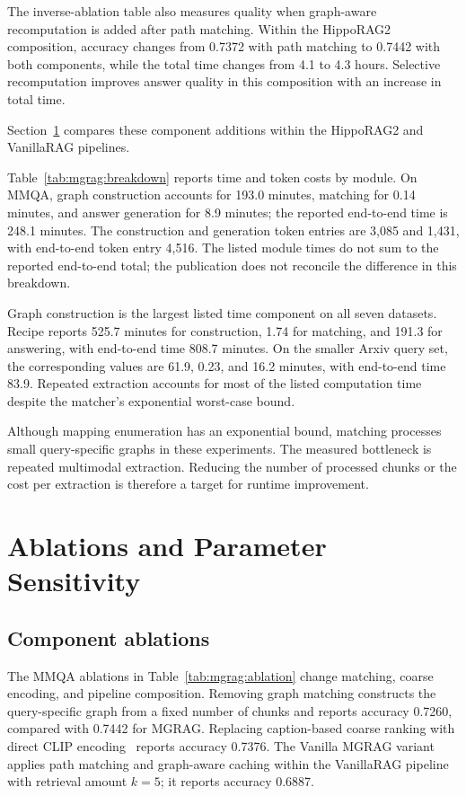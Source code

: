 The inverse-ablation table also measures quality when graph-aware recomputation is added after path matching. Within the HippoRAG2 composition, accuracy changes from 0.7372 with path matching to 0.7442 with both components, while the total time changes from 4.1 to 4.3 hours. Selective recomputation improves answer quality in this composition with an increase in total time.

Section~\ref{sec:mgrag:ablations} compares these component additions within the HippoRAG2 and VanillaRAG pipelines.

Table~\ref{tab:mgrag:breakdown} reports time and token costs by module. On MMQA, graph construction accounts for 193.0 minutes, matching for 0.14 minutes, and answer generation for 8.9 minutes; the reported end-to-end time is 248.1 minutes. The construction and generation token entries are 3,085 and 1,431, with end-to-end token entry 4,516. The listed module times do not sum to the reported end-to-end total; the publication does not reconcile the difference in this breakdown.



Graph construction is the largest listed time component on all seven datasets. Recipe reports 525.7 minutes for construction, 1.74 for matching, and 191.3 for answering, with end-to-end time 808.7 minutes. On the smaller Arxiv query set, the corresponding values are 61.9, 0.23, and 16.2 minutes, with end-to-end time 83.9. Repeated extraction accounts for most of the listed computation time despite the matcher's exponential worst-case bound.

Although mapping enumeration has an exponential bound, matching processes small query-specific graphs in these experiments. The measured bottleneck is repeated multimodal extraction. Reducing the number of processed chunks or the cost per extraction is therefore a target for runtime improvement.

\section{Ablations and Parameter Sensitivity}
\label{sec:mgrag:ablations}

\subsection{Component ablations}

The MMQA ablations in Table~\ref{tab:mgrag:ablation} change matching, coarse encoding, and pipeline composition. Removing graph matching constructs the query-specific graph from a fixed number of chunks and reports accuracy 0.7260, compared with 0.7442 for MGRAG. Replacing caption-based coarse ranking with direct CLIP encoding~\cite{mgrag-radford2021learning} reports accuracy 0.7376. The Vanilla MGRAG variant applies path matching and graph-aware caching within the VanillaRAG pipeline with retrieval amount $k=5$; it reports accuracy 0.6887.


